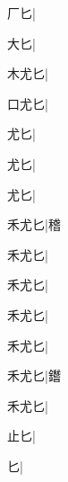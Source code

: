 \begin{multicols}{2}
{{\cjk{}{\cnsym{}　}厂匕}\mktsJzrVerticalBar{}{\cjk{}{\cnsym{}　}{\cnsym{}　}{\cnsym{}　}}|{}\par
{\cjk{}{\cnsym{}　}大匕}\mktsJzrVerticalBar{}{\cjk{}{\cnsym{}　}{\cnsym{}　}{\cnsym{}　}}|{}\par
{\cjk{}木尤匕}\mktsJzrVerticalBar{}{\cjk{}{\cnsym{}　}{\cnsym{}　}{\cnsym{}　}}|{}\par
{\cjk{}口尤匕}\mktsJzrVerticalBar{}{\cjk{}{\cnsym{}　}{\cnsym{}　}{\cnsym{}　}}|{}\par
{尤匕}\mktsJzrVerticalBar{}{\cjk{}{\cnsym{}　}{\cnsym{}　}{\cnsym{}　}}|{}\par
{尤匕}\mktsJzrVerticalBar{}{\cjk{}{\cnsym{}　}{\cnsym{}　}{\cnsym{}　}}|{}\par
{尤匕}|{}\par
{\cjk{}禾尤匕}\mktsJzrVerticalBar{}{\cjk{}{\cnsym{}　}{\cnsym{}　}{\cnsym{}　}}|{\cjk{}稽}\par
{\cjk{}禾尤匕}|{}\par
{\cjk{}禾尤匕}|{}\par
{\cjk{}禾尤匕}|{}\par
{\cjk{}禾尤匕}|{}\par
{\cjk{}禾尤匕}|{\cjk{}鑙}\par
{\cjk{}禾尤匕}|{}\par
{\cjk{}{\cnsym{}　}止匕}\mktsJzrVerticalBar{}{\cjk{}{\cnsym{}　}{\cnsym{}　}{\cnsym{}　}}|{}\par
{匕}\mktsJzrVerticalBar{}{\cjk{}{\cnsym{}　}{\cnsym{}　}{\cnsym{}　}}|{}\par
}
\end{multicols}
